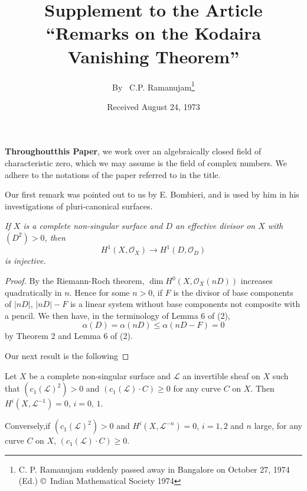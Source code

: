 \title{Supplement to the Article ``Remarks on the Kodaira Vanishing Theorem''}\label{art12}

\author{By~ C.P. Ramanujam\footnote{C. P. Ramanujam suddenly passed away in Bangalore on October 27, 1974 (Ed.)\break
\copyright\ Indian Mathematical Society 1974}}

\date{Received August 24, 1973}
\maketitle

\setcounter{page}{159}
\setcounter{pageoriginal}{124}
{\bf Throughout\pageoriginale this Paper}, we work over an algebraically closed field of characteristic zero, which we may assume is the field of complex numbers. We adhere to the notations of the paper referred to in the title.

Our first remark was pointed out to us by E. Bombieri, and is used by him in his investigations of pluri-canonical surfaces. 

{\em If $X$ is a complete non-singular surface and $D$ an effective divisor on $X$ with $(D^2) > 0$, then}
$$
H^1(X,\mathcal{O}_X) \to H^1 (D, \mathcal{O}_D)
$$
{\em is injective.}

\begin{proof}
By the Riemann-Roch theorem, $\dim H^0 (X,\mathcal{O}_X (nD))$ increases quadratically in $n$. Hence for some $n>0$, if $F$ is the divisor of base components of $|nD|$, $|nD|-F$ is a linear system without base components not composite with a pencil. We then have, in the terminology of Lemma 6 of (2),
$$
\alpha (D) = \alpha (nD) \leqslant \alpha (nD - F) = 0
$$
by Theorem 2 and Lemma 6 of (2).

Our next result is the following
\end{proof}

\begin{theorem*}
Let $X$ be a complete non-singular surface and $\mathcal{L}$ an invertible sheaf on $X$ such that $(c_1 (\mathcal{L})^2) >0$ and $(c_1 (\mathcal{L}) \cdot C) \geqslant 0$ for any curve $C$ on $X$. Then $H^i (X, \mathcal{L}^{-1}) = 0$, $i=0$, $1$. 

Conversely,\pageoriginale if $(c_1 (\mathcal{L})^2) > 0$ and $H^i (X, \mathcal{L}^{-n}) =0$, $i = 1,2$ and $n$ large, for any curve $C$ on $X$, $(c_1 (\mathcal{L}) \cdot C) \geqslant 0$.
\end{theorem*}

